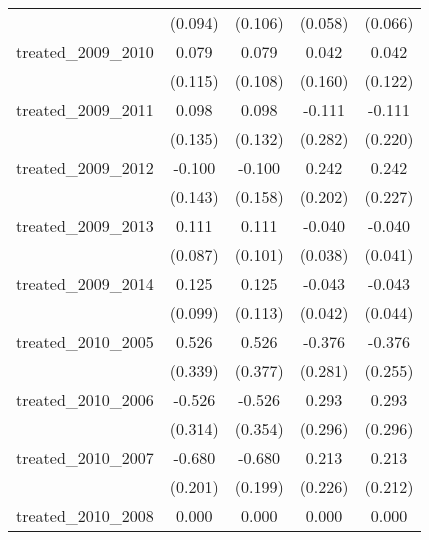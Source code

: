 {\begin{tabular}{l*{4}{c}}
            &     (0.094)         &     (0.106)         &     (0.058)         &     (0.066)         \\
[1em]
treated\_2009\_2010&       0.079         &       0.079         &       0.042         &       0.042         \\
            &     (0.115)         &     (0.108)         &     (0.160)         &     (0.122)         \\
[1em]
treated\_2009\_2011&       0.098         &       0.098         &      -0.111         &      -0.111         \\
            &     (0.135)         &     (0.132)         &     (0.282)         &     (0.220)         \\
[1em]
treated\_2009\_2012&      -0.100         &      -0.100         &       0.242         &       0.242         \\
            &     (0.143)         &     (0.158)         &     (0.202)         &     (0.227)         \\
[1em]
treated\_2009\_2013&       0.111         &       0.111         &      -0.040         &      -0.040         \\
            &     (0.087)         &     (0.101)         &     (0.038)         &     (0.041)         \\
[1em]
treated\_2009\_2014&       0.125         &       0.125         &      -0.043         &      -0.043         \\
            &     (0.099)         &     (0.113)         &     (0.042)         &     (0.044)         \\
[1em]
treated\_2010\_2005&       0.526         &       0.526         &      -0.376         &      -0.376         \\
            &     (0.339)         &     (0.377)         &     (0.281)         &     (0.255)         \\
[1em]
treated\_2010\_2006&      -0.526         &      -0.526         &       0.293         &       0.293         \\
            &     (0.314)         &     (0.354)         &     (0.296)         &     (0.296)         \\
[1em]
treated\_2010\_2007&      -0.680\sym{***}&      -0.680\sym{***}&       0.213         &       0.213         \\
            &     (0.201)         &     (0.199)         &     (0.226)         &     (0.212)         \\
[1em]
treated\_2010\_2008&       0.000         &       0.000         &       0.000         &       0.000         \\

\end{tabular}}
